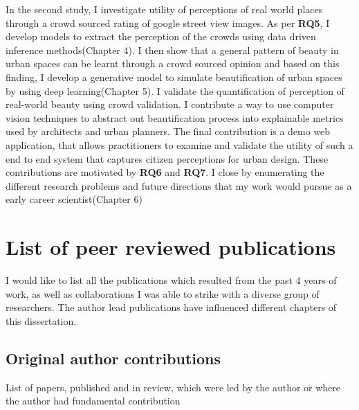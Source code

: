 In the second study, I investigate utility of perceptions of real world places through a crowd sourced rating of google street view images. As per \textbf{RQ5}, I develop models to extract the perception of the crowds using data driven inference methods(Chapter 4). 
I then show that a general pattern of beauty in urban spaces can be learnt through a crowd sourced opinion and based on this finding, I develop a generative model to simulate beautification of urban spaces by using deep learning(Chapter 5). I validate the quantification of perception of real-world beauty using crowd validation. I contribute a way to use computer vision techniques to abstract out beautification process into explainable metrics used by architects and urban planners. The final contribution is a demo web application, that allows practitioners to examine and validate the utility of such a end to end system that captures citizen perceptions for urban design. These contributions are motivated by \textbf{RQ6} and \textbf{RQ7}. 
I close by enumerating the different research problems and future directions that my work would pursue as a early career scientist(Chapter 6)



\section{List of peer reviewed publications}

I would like to list all the publications which resulted from the past 4 years of work, as well as collaborations I was able to strike with a diverse group of researchers. The author lead publications have influenced different chapters of this dissertation.

\subsection{Original author contributions}
List of papers, published and in review, which were led by the author or where the author had fundamental contribution

